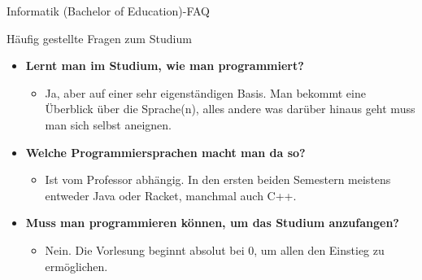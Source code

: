 \begin{Huge}
	Informatik (Bachelor of Education)-FAQ
\end{Huge}
\begin{block}{Häufig gestellte Fragen zum Studium}
\begin{large}
	\begin{itemize}
		\item \textbf{Lernt man im Studium, wie man programmiert?}
\begin{itemize}
	\item Ja, aber auf einer sehr eigenständigen Basis. Man bekommt eine Überblick über die Sprache(n), alles andere was darüber hinaus geht muss man sich selbst aneignen.
\end{itemize}

\item \textbf{Welche Programmiersprachen macht man da so?}
\begin{itemize}
	\item Ist vom Professor abhängig. In den ersten beiden Semestern meistens entweder Java oder Racket, manchmal auch C++.
\end{itemize}

\item \textbf{Muss man programmieren können, um das Studium anzufangen?}
\begin{itemize}
	\item Nein. Die Vorlesung beginnt absolut bei 0, um allen den Einstieg zu ermöglichen.
\end{itemize}



\end{itemize}
\end{large}
\end{block}
